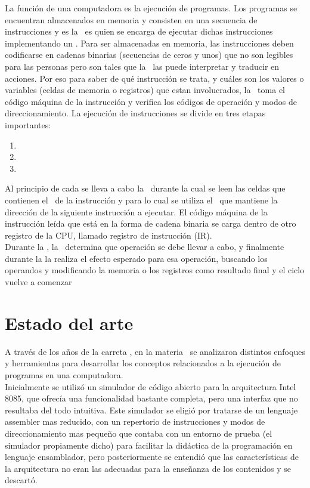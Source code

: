 La función de una computadora es la ejecución de programas. Los programas se encuentran almacenados en memoria y consisten en una secuencia de instrucciones y es la \UC\ es quien se encarga de ejecutar dichas instrucciones implementando un \textbf{\ciclo}. Para ser almacenadas en memoria, las instrucciones deben codificarse en cadenas binarias (secuencias de ceros y unos) que no son legibles para las personas pero son tales que la \UC\ las puede interpretar y traducir en acciones. Por eso para saber de qué instrucción se trata, y cuáles son los valores o variables (celdas de memoria o registros) que estan involucrados, la \UC\ toma el código máquina de la instrucción y verifica los códigos de operación y modos de direccionamiento. La ejecución de instrucciones se divide en tres etapas importantes: 

\begin{enumerate}
\item \BI
\item \DI
\item \EI
\end{enumerate}


Al principio de cada \ciclo se lleva a cabo la \BI\ durante la cual se leen las celdas que contienen el \codmaq\ de la instrucción y para lo cual se utiliza el \PC\ que mantiene la dirección de la siguiente instrucción a ejecutar.
El código máquina de la instrucción leída que está en la forma de cadena binaria se carga dentro de otro registro de la CPU, llamado registro de instrucción (IR).\\

Durante la \DI, la \UC\ determina que operación se debe llevar a cabo, y finalmente durante la \EI la \UC realiza el efecto esperado para esa operación, buscando los operandos y modificando la memoria o los registros como resultado final y el ciclo vuelve a comenzar

\section{Estado del arte}

A través de los años de la carreta \tpi, en la materia \orga\ se analizaron distintos enfoques y herramientas para desarrollar los conceptos relacionados a la ejecución de programas en una computadora.\\

Inicialmente se utilizó un simulador de código abierto para la arquitectura Intel 8085, que ofrecía una funcionalidad bastante completa, pero una interfaz que no resultaba del todo intuitiva.
Este simulador se eligió por tratarse de un lenguaje assembler mas reducido, con un repertorio de instrucciones y modos de direccionamiento mas pequeño que contaba con un entorno de prueba (el simulador propiamente dicho) para facilitar la didáctica de la programación en lenguaje ensamblador, pero posteriormente se entendió que las características de la arquitectura no eran las adecuadas para la enseñanza de los contenidos y se descartó.\\
 
